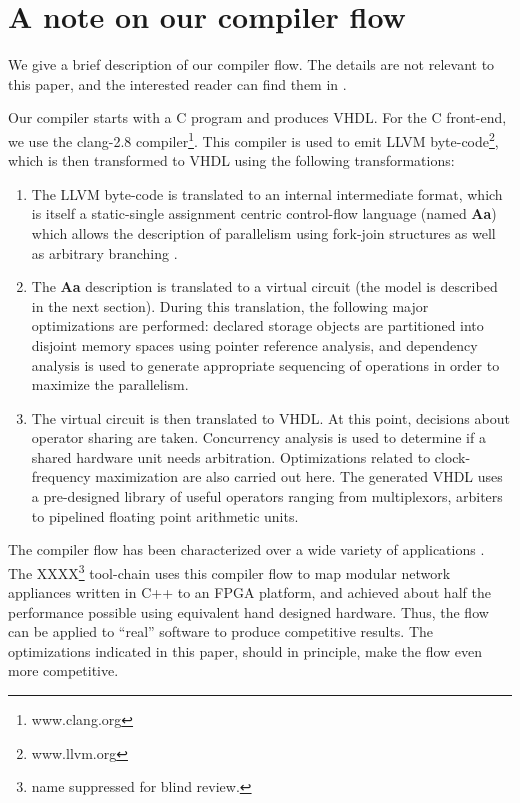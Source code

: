 \documentclass[conference]{IEEEtran}
\begin{document}

\section{A note on our compiler flow}

We give a brief description of our compiler flow.  The
details are not relevant to this paper, and the interested
reader can find them in \cite{ahirDsd2010}.

Our compiler starts with a C program and produces VHDL.  For the
C front-end, we use the clang-2.8 compiler\footnote{www.clang.org}.
This compiler is used to emit LLVM byte-code\footnote{www.llvm.org}, 
which is then transformed to VHDL using the following transformations:
\begin{enumerate}
\item The LLVM byte-code is translated to an internal intermediate
format, which is itself a static-single assignment centric 
control-flow language (named {\bf Aa}) which allows the description of parallelism
using fork-join structures as well as arbitrary branching \cite{Aa}.
\item The {\bf Aa} description is translated to a virtual circuit (the model
is described in the next section).  During this translation, the
following major optimizations
are performed:  declared storage objects are partitioned into disjoint memory
spaces using pointer reference analysis, and dependency analysis is used to
generate appropriate sequencing of operations in order to maximize the 
parallelism.
\item The virtual circuit is then translated to VHDL.  At this point,
decisions about operator sharing are taken.  Concurrency analysis is
used to determine if a shared hardware unit needs arbitration.  Optimizations
related to clock-frequency maximization are also carried out here.
The generated
VHDL uses a pre-designed library of useful operators ranging from
multiplexors, arbiters to pipelined floating point arithmetic units.
\end{enumerate}

The compiler flow has been characterized over a wide variety
of applications \cite{ahirDsd2010}.   The XXXX\footnote{name suppressed for blind review.} tool-chain \cite{ahirUsenix2012} 
uses this compiler flow to map modular network appliances written in C++ to
an FPGA platform, and achieved about half the
performance possible using equivalent hand designed hardware.  
Thus,  the flow can be applied to ``real'' software
to produce competitive results.  The optimizations indicated in this
paper, should in principle, make the flow even more competitive.
\end{document}
